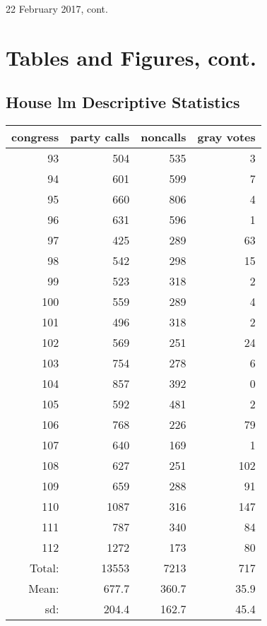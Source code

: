 \documentclass[12pt]{article}
\begin{document}
	
\begin{center}
	\Large 22 February 2017, cont.
\end{center}
	
\section{Tables and Figures, cont.}
	
\subsection{House lm Descriptive Statistics}

\begin{table}[ht]
	\centering
	\begin{tabular}{rrrr}
		\hline
		congress & party calls & noncalls & gray votes \\ 
		\hline
		93 & 504 & 535 &   3 \\ 
		94 & 601 & 599 &   7 \\ 
		95 & 660 & 806 &   4 \\ 
		96 & 631 & 596 &   1 \\ 
		97 & 425 & 289 &  63 \\ 
		98 & 542 & 298 &  15 \\ 
		99 & 523 & 318 &   2 \\ 
		100 & 559 & 289 &   4 \\ 
		101 & 496 & 318 &   2 \\ 
		102 & 569 & 251 &  24 \\ 
		103 & 754 & 278 &   6 \\ 
		104 & 857 & 392 &   0 \\ 
		105 & 592 & 481 &   2 \\ 
		106 & 768 & 226 &  79 \\ 
		107 & 640 & 169 &   1 \\ 
		108 & 627 & 251 & 102 \\ 
		109 & 659 & 288 &  91 \\ 
		110 & 1087 & 316 & 147 \\ 
		111 & 787 & 340 &  84 \\ 
		112 & 1272 & 173 &  80 \\
		\hline
		Total: & 13553 & 7213 & 717 \\
		Mean: & 677.7 & 360.7 & 35.9 \\
		sd: & 204.4 & 162.7 & 45.4 \\
		\hline
	\end{tabular}
\end{table}
\end{document}
